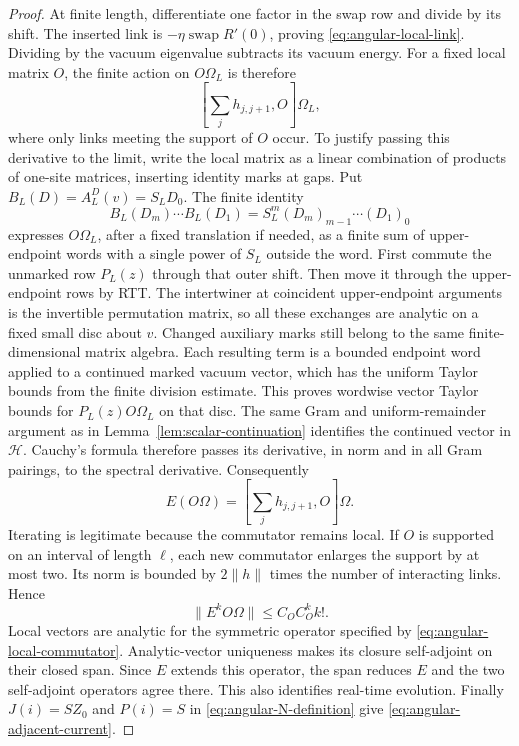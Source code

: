 \begin{proof}
At finite length, differentiate one factor in the swap row and divide
by its shift.  The inserted link is
$-\eta\operatorname{swap}R'(0)$, proving
\eqref{eq:angular-local-link}.  Dividing by the vacuum eigenvalue
subtracts its vacuum energy.  For a fixed local matrix $O$, the finite
action on $O\Omega_L$ is therefore
\[
 \left[\sum_jh_{j,j+1},O\right]\Omega_L,
\]
where only links meeting the support of $O$ occur.  To justify passing this derivative to the limit, write the local matrix
as a linear combination of products of one-site matrices, inserting
identity marks at gaps. Put $B_L(D)=A_L^D(v)=S_LD_0$. The finite
identity
\[
 B_L(D_m)\cdots B_L(D_1)
   =S_L^m(D_m)_{m-1}\cdots(D_1)_0
\]
expresses $O\Omega_L$, after a fixed translation if needed, as a
finite sum of upper-endpoint words with a single power of $S_L$
outside the word. First commute the unmarked row $P_L(z)$ through
that outer shift. Then move it through the upper-endpoint rows by
RTT. The intertwiner at coincident upper-endpoint arguments is the
invertible permutation matrix, so all these exchanges are analytic
on a fixed small disc about $v$. Changed auxiliary marks still belong
to the same finite-dimensional matrix algebra. Each resulting term
is a bounded endpoint word applied to a continued marked vacuum
vector, which has the uniform Taylor bounds from the finite division
estimate. This proves wordwise vector Taylor bounds for $P_L(z)O\Omega_L$
on that disc. The same Gram and uniform-remainder argument as in
Lemma~\ref{lem:scalar-continuation} identifies the continued vector
in $\mathcal H$. Cauchy's formula
therefore passes its derivative, in norm and in all Gram pairings, to
the spectral derivative.  Consequently
\begin{equation}\label{eq:angular-local-commutator}
 E(O\Omega)=\left[\sum_jh_{j,j+1},O\right]\Omega.
\end{equation}
Iterating is legitimate because the commutator remains local.
If $O$ is supported on an interval of length $\ell$, each new
commutator enlarges the support by at most two.  Its norm is bounded
by $2\|h\|$ times the number of interacting links.  Hence
\[
 \|E^kO\Omega\|\le C_O C_O^k k!.
\]
Local vectors are analytic for the symmetric operator specified by
\eqref{eq:angular-local-commutator}.  Analytic-vector uniqueness makes
its closure self-adjoint on their closed span.  Since $E$ extends this
operator, the span reduces $E$ and the two self-adjoint operators agree
there.  This also identifies real-time evolution.  Finally
$J(i)=SZ_0$ and $P(i)=S$ in
\eqref{eq:angular-N-definition} give
\eqref{eq:angular-adjacent-current}.
\end{proof}


